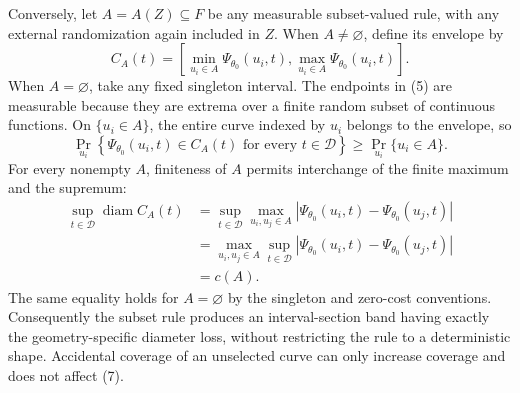 Conversely, let \(A=A(Z)\subseteq F\) be any measurable subset-valued rule, with any external randomization again included in \(Z\).  When \(A\ne\varnothing\), define its envelope by
\[
 C_A(t)=
 \left[
   \min_{u_i\in A}\Psi_{\theta_0}(u_i,t),
   \max_{u_i\in A}\Psi_{\theta_0}(u_i,t)
 \right].
\tag{5}
\]
When \(A=\varnothing\), take any fixed singleton interval.  The endpoints in (5) are measurable because they are extrema over a finite random subset of continuous functions.  On \(\{u_i\in A\}\), the entire curve indexed by \(u_i\) belongs to the envelope, so
\[
 \Pr_{u_i}\!\left\{
   \Psi_{\theta_0}(u_i,t)\in C_A(t)
   \text{ for every }t\in\mathcal D\right\}
 \geq \Pr_{u_i}\{u_i\in A\}.
\tag{6}
\]
For every nonempty \(A\), finiteness of \(A\) permits interchange of the finite maximum and the supremum:
\[
\begin{aligned}
 \sup_{t\in\mathcal D}\operatorname{diam}C_A(t)
 &=\sup_{t\in\mathcal D}\max_{u_i,u_j\in A}
   \left|\Psi_{\theta_0}(u_i,t)-\Psi_{\theta_0}(u_j,t)\right|\\
 &=\max_{u_i,u_j\in A}\sup_{t\in\mathcal D}
   \left|\Psi_{\theta_0}(u_i,t)-\Psi_{\theta_0}(u_j,t)\right|\\
 &=c(A).
\end{aligned}
\tag{7}
\]
The same equality holds for \(A=\varnothing\) by the singleton and zero-cost conventions.  Consequently the subset rule produces an interval-section band having exactly the geometry-specific diameter loss, without restricting the rule to a deterministic shape.  Accidental coverage of an unselected curve can only increase coverage and does not affect (7).

